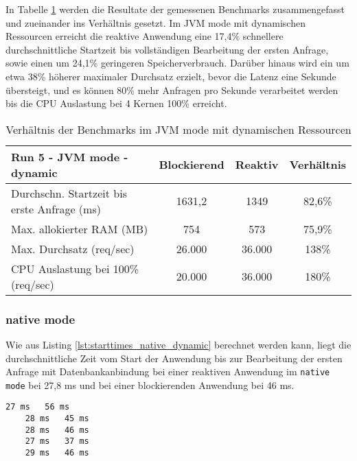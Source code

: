 In Tabelle \ref{table:dynamic_jvm_measurement_results} werden die Resultate der gemessenen Benchmarks zusammengefasst
und zueinander ins Verhältnis gesetzt. Im JVM mode mit dynamischen Ressourcen erreicht die reaktive Anwendung
eine 17,4\% schnellere durchschnittliche Startzeit bis vollständigen Bearbeitung der ersten Anfrage, sowie
einen um 24,1\% geringeren Speicherverbrauch.
Darüber hinaus wird ein um etwa 38\% höherer maximaler Durchsatz erzielt, bevor die Latenz eine Sekunde übersteigt, und
es können 80\% mehr Anfragen pro Sekunde verarbeitet werden bis die CPU Auslastung bei 4 Kernen 100\% erreicht.

\begin{table}[ht!]
    \begin{tabular}{|l | c | c | c|}
        \hline
        Run 5 - JVM mode - dynamic & Blockierend & Reaktiv & Verhältnis \\
        \hline
        \makecell[l]{Durchschn. Startzeit bis                           \\erste Anfrage (ms)} &   1631,2    &  1349  &   82,6\%   \\
        \hline
        Max. allokierter RAM (MB)  & 754         & 573     & 75,9\%     \\
        \hline
        Max. Durchsatz (req/sec)   & 26.000      & 36.000  & 138\%      \\
        \hline
        \makecell[l]{CPU Auslastung bei 100\%                           \\ (req/sec)} & 20.000 & 36.000 & 180\%  \\
        \hline
    \end{tabular}
    \caption{Verhältnis der Benchmarks im JVM mode mit dynamischen Ressourcen}
    \label{table:dynamic_jvm_measurement_results}
\end{table}


\subsubsection{native mode}
\label{subsubsec:dynamic_native_mode}
Wie aus Listing \ref{lst:starttimes_native_dynamic} berechnet werden kann, liegt die durchschnittliche Zeit vom Start der Anwendung
bis zur Bearbeitung der ersten Anfrage mit Datenbankanbindung bei einer reaktiven Anwendung im \verb|native mode| bei 27,8 ms und bei
einer blockierenden Anwendung bei 46 ms.

\begin{lstlisting}[caption=Startzeiten im JVM mode mit dynamischen Ressourcen, captionpos=b, label=lst:starttimes_native_dynamic]
    27 ms   56 ms
    28 ms   45 ms
    28 ms   46 ms
    27 ms   37 ms
    29 ms   46 ms
\end{lstlisting}

